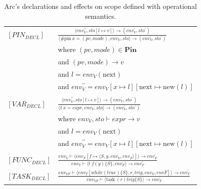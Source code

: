\begin{table}[htb!]
    \small
    \centering
    \begin{tabular}{ll}
        \toprule
        $[PIN_{DECL}]$  & $\frac
            {\langle env^{\prime\prime}_V, sto[l \mapsto v] \rangle \rightarrow (env^\prime_V, sto^\prime)}
            {\langle \text{\#pin} \ x = (pv, mode), env_V, sto\rangle\rightarrow (env^\prime_V, sto^\prime)}$ \\ [12pt]
                        & where $(pv, mode) \in \textbf{Pin} $                                                \\
                        & and $(pv,mode) \rightarrow v $                                                      \\
                        & and $l = env_V(\text{next})$                                                        \\
                        & and $env^{\prime\prime}_V = env_V[x \mapsto l][\text{next} \mapsto \text{new}(l)] $ \\
        \\

        $[VAR_{DECL}]$  & $\frac
            {\langle env^{\prime\prime}_V, sto[l \mapsto v] \rangle \rightarrow (env^\prime_V, sto^\prime)}
            {\langle t \ x = expr, env_V, sto\rangle\rightarrow (env^\prime_V, sto^\prime)}$                  \\ [12pt]
                        & where $env_V, sto \vdash expr \rightarrow v $                                       \\
                        & and $l = env_V(\text{next})$                                                        \\
                        & and $env^{\prime\prime}_V = env_V[x \mapsto l][\text{next} \mapsto \text{new}(l)] $ \\
        \\

        $[FUNC_{DECL}]$ & $\frac
            {env_V \vdash \langle env_F[f \mapsto \langle S, y, env_V, env_F\rangle] \rangle \rightarrow env^\prime_F}
            {env_V \vdash \langle t \ f (y) \{S \}, env_F \rangle \rightarrow env^\prime_F}$                  \\ [12pt]

        $[TASK_{DECL}]$ & $\frac
            {env_{VF}\vdash \langle env_T[while(true)\{ S \}, r, trig, env_V, envF] \rangle \rightarrow env^\prime_T}
            {env_{VF}\vdash \langle \text{task} \ (r) trig \{S\} \rangle \rightarrow env^\prime_T}$           \\
        \bottomrule
    \end{tabular}
    \caption{Arc's declarations and effects on scope defined with operational semantics.}
    \label{tab:arcscoperules}
\end{table}


